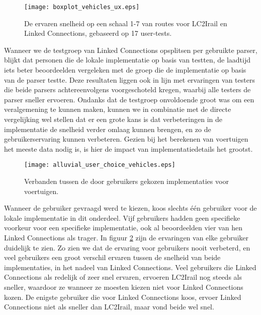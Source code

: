 \begin{figure}[h]
	\centering
	\texttt{[image: boxplot\_vehicles\_ux.eps]}
	\caption[Ervaren snelheid van routes]{De ervaren snelheid op een schaal 1-7 van routes voor LC2Irail en Linked Connections, gebaseerd op 17 user-tests.}
	\label{fig:vehiclesUx}
\end{figure}

Wanneer we de testgroep van Linked Connections opsplitsen per gebruikte parser, blijkt dat personen die de lokale implementatie op basis van  testten, de laadtijd iets beter beoordeelden vergeleken met de groep die de implementatie op basis van de  parser testte. Deze resultaten liggen ook in lijn met ervaringen van testers die beide parsers achtereenvolgens voorgeschoteld kregen, waarbij alle testers de  parser sneller ervoeren. Ondanks dat de testgroep onvoldoende groot was om een veralgemening te kunnen maken, kunnen we in combinatie met de directe vergelijking wel stellen dat er een grote kans is dat verbeteringen in de implementatie de snelheid verder omlaag kunnen brengen, en zo de gebruikerservaring kunnen verbeteren. Gezien bij het berekenen van voertuigen het meeste data nodig is, is hier de impact van implementatiedetails het grootst.

\begin{figure}[ht]
	\centering
	\texttt{[image: alluvial\_user\_choice\_vehicles.eps]}
	\caption[Door gebruikers gekozen implementatie voor voertuigen]{Verbanden tussen de door gebruikers gekozen implementaties voor voertuigen. }
	\label{fig:alluvialUserChoicesVehicles}
\end{figure}

Wanneer de gebruiker gevraagd werd te kiezen, koos slechts één gebruiker voor de lokale implementatie in dit onderdeel. Vijf gebruikers hadden geen specifieke voorkeur voor een specifieke implementatie, ook al beoordeelden vier van hen Linked Connections als trager. In figuur \ref{fig:alluvialUserChoicesVehicles} zijn de ervaringen van elke gebruiker duidelijk te zien. Zo zien we dat de ervaring voor gebruikers nooit verbeterd, en veel gebruikers een groot verschil ervaren tussen de snelheid van beide implementaties, in het nadeel van Linked Connections. Veel gebruikers die Linked Connections als redelijk of zeer snel ervaren, ervoeren LC2Irail nog steeds als sneller, waardoor ze wanneer ze moesten kiezen niet voor Linked Connections kozen. De enigste gebruiker die voor Linked Connections koos, ervoer Linked Connections niet als sneller dan LC2Irail, maar vond beide wel snel.

